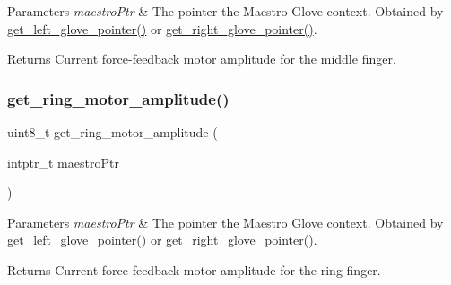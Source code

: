 \begin{DoxyParams}{Parameters}
{\em maestro\+Ptr} & The pointer the Maestro Glove context. Obtained by \hyperlink{group__glove_management_ga63ce3c99d4a8b8db851b22af9185764e}{get\+\_\+left\+\_\+glove\+\_\+pointer()} or \hyperlink{group__glove_management_ga9b8fd9d91aeac3f8da50f7a7eba0c32b}{get\+\_\+right\+\_\+glove\+\_\+pointer()}. \\
\hline
\end{DoxyParams}
\begin{DoxyReturn}{Returns}
Current force-\/feedback motor amplitude for the middle finger. 
\end{DoxyReturn}
\mbox{\label{group__force_feedback_control_ga10d53dad9720a77b092ff74d7d7c4111}} 
\subsubsection{\texorpdfstring{get\+\_\+ring\+\_\+motor\+\_\+amplitude()}{get\_ring\_motor\_amplitude()}}
{\footnotesize\ttfamily uint8\+\_\+t get\+\_\+ring\+\_\+motor\+\_\+amplitude (\begin{DoxyParamCaption}\item[{intptr\+\_\+t}]{maestro\+Ptr }\end{DoxyParamCaption})}


\begin{DoxyParams}{Parameters}
{\em maestro\+Ptr} & The pointer the Maestro Glove context. Obtained by \hyperlink{group__glove_management_ga63ce3c99d4a8b8db851b22af9185764e}{get\+\_\+left\+\_\+glove\+\_\+pointer()} or \hyperlink{group__glove_management_ga9b8fd9d91aeac3f8da50f7a7eba0c32b}{get\+\_\+right\+\_\+glove\+\_\+pointer()}. \\
\hline
\end{DoxyParams}
\begin{DoxyReturn}{Returns}
Current force-\/feedback motor amplitude for the ring finger. 
\end{DoxyReturn}
\mbox{\label{group__force_feedback_control_ga54aef0ba5f346eb893bb9e18bdd9a7c6}} 
